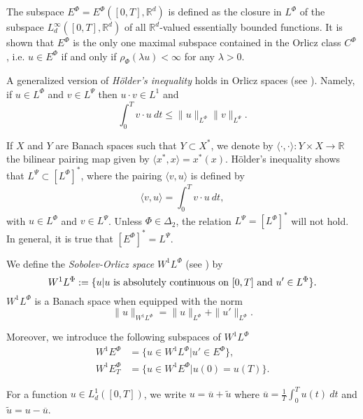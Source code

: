 \documentclass[twoside]{article}
\theoremstyle{remark}
\newcommand{\orlnor}{\|_{L^{\Phi}}}
\newcommand{\lphi}{L^{\Phi}}
\newcommand{\lpsi}{L^{\Psi}}
\newcommand{\ephi}{E^{\Phi}}
\newcommand{\claseor}{C^{\Phi}}
\newcommand{\wphi}{W^{1}\lphi}
\newcommand{\wphie}{W^{1}\ephi}
\newcommand{\rr}{\mathbb{R}}
\renewcommand{\leq}{\leqslant}
\begin{document}
The subspace $\ephi=\ephi([0,T],\rr^d)$ is defined as the closure in $\lphi$ of the subspace $L^{\infty}_d([0,T],\rr^d)$ of all $\mathbb{R}^d$-valued essentially bounded functions. It is shown that  $\ephi$ is the only one maximal subspace contained in the Orlicz class $\claseor$, i.e.
$u\in\ephi$ if and only if $\rho_{\Phi}(\lambda u)<\infty$ for any $\lambda>0$.

A generalized version of \emph{H\"older's inequality} holds in Orlicz spaces (see \cite[Thm. 9.3]{KR}). Namely, if $u\in\lphi$ and $v\in\lpsi$ then $u\cdot v\in L^1$ and
\begin{equation}\label{holder}
\int_0^Tv\cdot u\ dt\leq \|u\orlnor\|v\|_{L^{\Psi}}.
\end{equation}




If $X$ and $Y$ are  Banach spaces such that  $Y\subset X^*$, we denote by $\langle\cdot,\cdot\rangle:Y\times X\to\mathbb{R}$ the bilinear pairing  map given by $\langle x^*,x\rangle=x^*(x)$. H\"older's inequality shows that $\lpsi\subset \left[\lphi\right]^*$, where the pairing
$\langle v, u\rangle$
is defined by 
\begin{equation}\label{pairing}
  \langle v,u\rangle=\int_0^Tv\cdot u\ dt,
\end{equation}
with  $u\in\lphi$ and $v\in\lpsi$.
 Unless $\Phi \in \Delta_2$, the relation $\lpsi= \left[\lphi\right]^*$ will not hold. In general, it is true  that  $\left[\ephi\right]^*=\lpsi$.



We define the \emph{Sobolev-Orlicz space} $\wphi$ (see \cite{adams_sobolev}) by
\[\wphi:=\{u| u \hbox{ is absolutely continuous on $[0,T]$ and } u'\in \lphi\}.\]
$\wphi$ is a Banach space when equipped with the norm
\begin{equation}\label{def-norma-orlicz-sob}
\|  u  \|_{\wphi}= \|  u  \|_{\lphi} + \|u'\orlnor.
\end{equation}

Moreover, we introduce the following subspaces of $\wphi$
\begin{equation}\label{def-esp-orlicz-sob-per}
\begin{split}
\wphie&=\{u\in\wphi|u'\in\ephi\},\\
\wphie_T&=\{u\in\wphie|u(0)=u(T)\}.
\end{split}
\end{equation}



For a  function $u\in L^1_d([0,T])$, we write $u=\overline{u}+\widetilde{u}$ where $\overline{u} =\frac1T\int_0^T u(t)\ dt$ and $\widetilde{u}=u-\overline{u}$.
\end{document}
